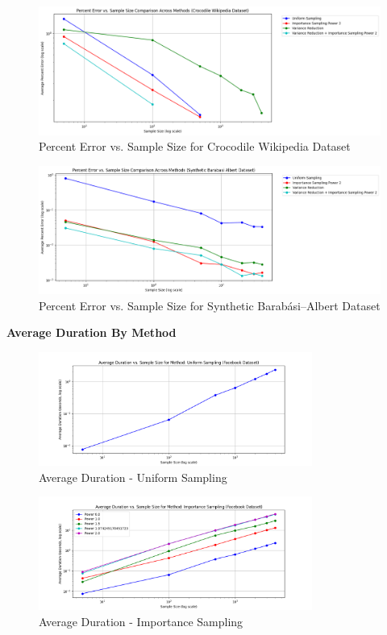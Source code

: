 \documentclass[11pt]{article}
\newcommand{\subsubsubsection}[1]{
  \vspace{1em} %
  \noindent\textbf{#1} %
  \vspace{0.5em} %
}
\begin{document}
\begin{figure}[H]
\centering
\includegraphics[width=0.9\linewidth]{plots/comparisons/croc/limited_method_percent_error_vs_sample_size_comparison.png}
\caption{Percent Error vs. Sample Size for Crocodile Wikipedia Dataset}
\label{fig:croc_sample_size}
\end{figure}

\begin{figure}[H]
\centering
\includegraphics[width=0.9\linewidth]{plots/comparisons/ba/limited_method_percent_error_vs_sample_size_comparison.png}
\caption{Percent Error vs. Sample Size for Synthetic Barabási–Albert Dataset}
\label{fig:ba_sample_size}
\end{figure}

\subsubsubsection{Average Duration By Method}
\begin{figure}[H]
    \centering
    \includegraphics[width=0.8\textwidth]{plots/durations/avg_duration_Uniform Sampling.png}
    \caption{Average Duration - Uniform Sampling}
    \label{fig:avg_duration_uniform}
\end{figure}

\begin{figure}[H]
    \centering
    \includegraphics[width=0.8\textwidth]{plots/durations/avg_duration_Importance Sampling.png}
    \caption{Average Duration - Importance Sampling}
    \label{fig:avg_duration_importance}
\end{figure}
\end{document}

